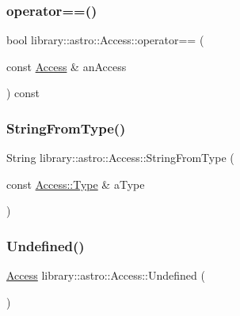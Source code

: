 \subsubsection{\texorpdfstring{operator==()}{operator==()}}
{\footnotesize\ttfamily bool library\+::astro\+::\+Access\+::operator== (\begin{DoxyParamCaption}\item[{const \hyperlink{classlibrary_1_1astro_1_1_access}{Access} \&}]{an\+Access }\end{DoxyParamCaption}) const}

\mbox{\label{classlibrary_1_1astro_1_1_access_a3b55776350970c505c39b0a4224be87b}} 
\subsubsection{\texorpdfstring{String\+From\+Type()}{StringFromType()}}
{\footnotesize\ttfamily String library\+::astro\+::\+Access\+::\+String\+From\+Type (\begin{DoxyParamCaption}\item[{const \hyperlink{classlibrary_1_1astro_1_1_access_a2574b0e3f1e5ecca60471ccd04b9ff45}{Access\+::\+Type} \&}]{a\+Type }\end{DoxyParamCaption})\hspace{0.3cm}{\ttfamily [static]}}

\mbox{\label{classlibrary_1_1astro_1_1_access_a00f9162943f30995d177a46eb79068a4}} 
\subsubsection{\texorpdfstring{Undefined()}{Undefined()}}
{\footnotesize\ttfamily \hyperlink{classlibrary_1_1astro_1_1_access}{Access} library\+::astro\+::\+Access\+::\+Undefined (\begin{DoxyParamCaption}{ }\end{DoxyParamCaption})\hspace{0.3cm}{\ttfamily [static]}}



